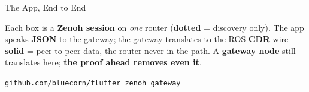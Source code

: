 \documentclass[9pt]{beamer}
\begin{document}
\begin{frame}{The App, End to End}
  \vspace{0.2em}
  \begin{center}{\small Each box is a \textbf{Zenoh session} on \emph{one} router (\textbf{dotted} = discovery only). The app speaks \textbf{JSON} to the gateway; the gateway translates to the ROS \textbf{CDR} wire --- \textbf{solid} = peer-to-peer data, the router never in the path. A \textbf{gateway node} still translates here; \textbf{the proof ahead removes even it}.}\end{center}

  {\small\textcolor{m3LightPrimary}{\texttt{github.com/bluecorn/flutter\_zenoh\_gateway}}}
\end{frame}

\end{document}
